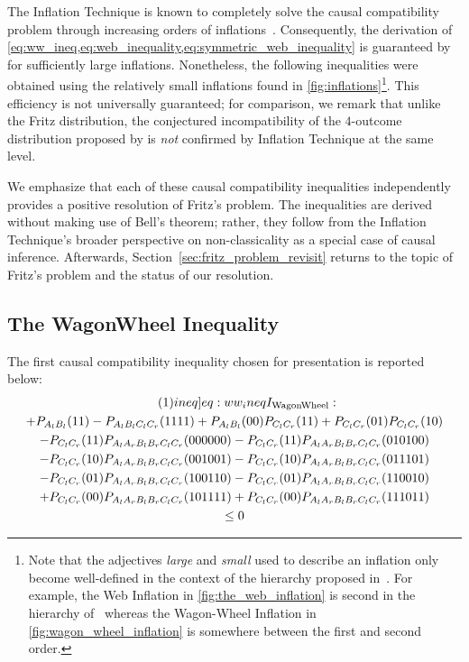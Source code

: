 \documentclass[aps, 10pt, english, twoside, pra, nofootinbib, tightenlines, longbibliography, superscriptaddress]{revtex4-1}
\begin{document}
    The Inflation Technique is known to completely solve the causal compatibility problem through increasing orders of inflations~\cite{Navascues_2017}. Consequently, the derivation of \cref{eq:ww_ineq,eq:web_inequality,eq:symmetric_web_inequality} is guaranteed by~\cite{Navascues_2017} for sufficiently large inflations. Nonetheless, the following inequalities were obtained using the relatively small inflations found in \cref{fig:inflations}\footnote{Note that the adjectives \textit{large} and \textit{small} used to describe an inflation only become well-defined in the context of the hierarchy proposed in~\cite{Navascues_2017}. For example, the Web Inflation in \cref{fig:the_web_inflation} is second in the hierarchy of~\cite{Navascues_2017} whereas the Wagon-Wheel Inflation in \cref{fig:wagon_wheel_inflation} is somewhere between the first and second order.}. This efficiency is not universally guaranteed; for comparison, we remark that unlike the Fritz distribution, the conjectured incompatibility of the $4$-outcome distribution proposed by \cite{Gisin_2017} is \textit{not} confirmed by Inflation Technique at the same level.

    We emphasize that each of these causal compatibility inequalities independently provides a positive resolution of Fritz's problem. The inequalities are derived without making use of Bell's theorem; rather, they follow from the Inflation Technique's broader perspective on non-classicality as a special case of causal inference. Afterwards, Section~\ref{sec:fritz_problem_revisit} returns to the topic of Fritz's problem and the status of our resolution.

    \subsection{The WagonWheel Inequality}
    The first causal compatibility inequality chosen for presentation is reported below:
    \begin{equation*}
    \begin{gathered}
        \eq\label[ineq]{eq:ww_ineq}
        I\tsb{WagonWheel} : \\
        +P_{A_{l}B_{l}}(11) -P_{A_{l}B_{l}C_{l}C_{r}}(1111) +P_{A_{l}B_{l}}(00) P_{C_{l}C_{r}}(11) +P_{C_{l}C_{r}}(01) P_{C_{l}C_{r}}(10) \\
        -P_{C_{l}C_{r}}(11) P_{A_{l}A_{r}B_{l}B_{r}C_{l}C_{r}}(000000) -P_{C_{l}C_{r}}(11) P_{A_{l}A_{r}B_{l}B_{r}C_{l}C_{r}}(010100) \\
        -P_{C_{l}C_{r}}(10) P_{A_{l}A_{r}B_{l}B_{r}C_{l}C_{r}}(001001) -P_{C_{l}C_{r}}(10) P_{A_{l}A_{r}B_{l}B_{r}C_{l}C_{r}}(011101) \\
        -P_{C_{l}C_{r}}(01) P_{A_{l}A_{r}B_{l}B_{r}C_{l}C_{r}}(100110) -P_{C_{l}C_{r}}(01) P_{A_{l}A_{r}B_{l}B_{r}C_{l}C_{r}}(110010) \\
        +P_{C_{l}C_{r}}(00) P_{A_{l}A_{r}B_{l}B_{r}C_{l}C_{r}}(101111) +P_{C_{l}C_{r}}(00) P_{A_{l}A_{r}B_{l}B_{r}C_{l}C_{r}}(111011) \\
        \leq 0
    \end{gathered}
    \end{equation*}
\end{document}
